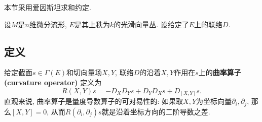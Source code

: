

本节采用爱因斯坦求和约定.

设$M$是$n$维微分流形, $E$是其上秩为$k$的光滑向量丛. 设给定了$E$上的联络$D$.

\subsection{定义}
给定截面$s\in\Gamma(E)$和切向量场$X,Y$, 联络$D$的沿着$X,Y$作用在$s$上的\textbf{曲率算子 (curvature operator)} 定义为
$$
R(X,Y)s=-D_XD_Ys+D_YD_Xs+D_{[X,Y]}s.
$$
直观来说, 曲率算子是量度导数算子的可对易性的: 如果取$X,Y$为坐标向量$\partial_i,\partial_j$, 那么$[X,Y]=0$, 从而$R(\partial_i,\partial_j)s$就是沿着坐标方向的二阶导数之差.

